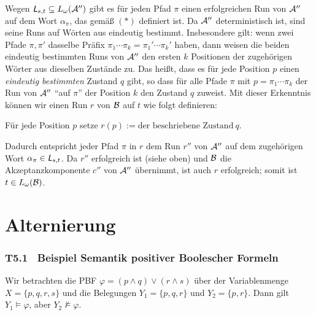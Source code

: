 \documentclass[fontsize=11pt, twoside=false, numbers=autoenddot]{scrbook}
\begin{document}
\begin{description}
    Wegen $\textsf{\textit{L}}_{s,t} \subseteq L_\omega(\mathcal{A}'')$ gibt es für jeden Pfad $\pi$
    einen erfolgreichen Run von $\mathcal{A}''$ auf dem Wort $\alpha_\pi$,
    das gemäß $(*)$ definiert ist.
    Da $\mathcal{A}''$ deterministisch ist, sind seine Runs auf Wörten aus \Lst
    eindeutig bestimmt.
    Insbesondere gilt: wenn zwei Pfade $\pi,\pi'$ dasselbe Präfix
    $\pi_1\cdots\pi_k=\pi_1'\cdots\pi_k'$ haben,
    dann weisen die beiden eindeutig bestimmten Runs von $\mathcal{A}''$
    den ersten $k$ Positionen der zugehörigen Wörter aus \Lst
    dieselben Zustände zu.
    Das heißt, dass es für jede Position $p$ einen \emph{eindeutig bestimmten}
    Zustand $q$ gibt, so dass für alle Pfade $\pi$ mit $p=\pi_1\cdots\pi_k$
    der Run von $\mathcal{A}''$ "`auf $\pi$"' der Position $k$ den Zustand $q$ zuweist.
    Mit dieser Erkenntnis können wir einen Run $r$ von $\mathcal{B}$ auf $t$ wie folgt definieren:
    \begin{center}
      \parbox{.8\linewidth}{%
        Für jede Position $p$ setze $r(p) := \text{der beschriebene Zustand}~ q$.
      }
    \end{center}
    Dadurch entspricht jeder Pfad $\pi$ in $r$ dem Run $r''$ von $\mathcal{A}''$
    auf dem zugehörigen Wort $\alpha_\pi \in \textsf{\textit{L}}_{s,t}$.
    Da $r''$ erfolgreich ist (siehe oben) und $\mathcal{B}$ die Akzeptanzkomponente $c''$
    von $\mathcal{A}''$ übernimmt, ist auch $r$ erfolgreich;
    somit ist $t \in L_\omega(\mathcal{B})$.
    \qedhere
\end{description}

\part{Alternierung}

\section*{T5.1~ Beispiel Semantik positiver Boolescher Formeln}

Wir betrachten die PBF $\varphi = (p \land q) \lor (r \land s)$
über der Variablenmenge $X = \{p,q,r,s\}$
und die Belegungen $Y_1 = \{p,q,r\}$ und $Y_2 = \{p,r\}$.
Dann gilt $Y_1 \models \varphi$, aber $Y_2 \not\models \varphi$.

\end{document}
